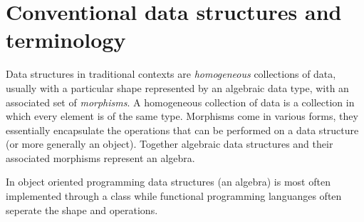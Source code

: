 \chapter{Conventional data structures and terminology}
Data structures in traditional contexts are \textit{homogeneous} collections of data, usually with a particular shape represented by an algebraic data type, with an associated set of \textit{morphisms}.
A homogeneous collection of data is a collection in which every element is of the same type.
Morphisms come in various forms, they essentially encapsulate the operations that can be performed on a data structure (or more generally an object).
Together algebraic data structures and their associated morphisms represent an algebra.
\begin{remark}
    In object oriented programming data structures (an algebra) is most often implemented through a class while functional programming languanges often seperate the shape and operations.
\end{remark}


